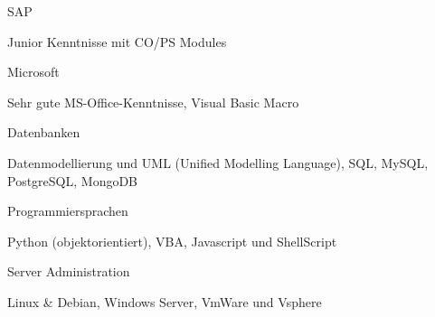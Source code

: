 


\begin{cventries}
	
	\zcventry
	{SAP} %
	{
		\begin{cvitems} %
			\item {Junior Kenntnisse mit CO/PS Modules}
		\end{cvitems}
	}
	
	\zcventry
	{Microsoft} %
	{
		\begin{cvitems} %
			\item {Sehr gute MS-Office-Kenntnisse, Visual Basic Macro}
		\end{cvitems}
	}
	
	\zcventry
	{Datenbanken} %
	{
		\begin{cvitems} %
			\item {Datenmodellierung und UML (Unified Modelling Language), SQL, MySQL, PostgreSQL, MongoDB}
		\end{cvitems}
	}
	
	\zcventry
	{Programmiersprachen} %
	{
		\begin{cvitems} %
			\item {Python (objektorientiert), VBA, Javascript und ShellScript}
		\end{cvitems}
	}
	
	\zcventry
	{Server Administration} %
	{
		\begin{cvitems} %
			\item {Linux \& Debian, Windows Server, VmWare und Vsphere}
		\end{cvitems}
	}
	

\end{cventries}

